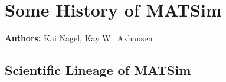 \chapter{Some History of MATSim}
\label{ch:history}

\hfill \textbf{Authors:} Kai Nagel, Kay W.\ Axhausen


%
%


\section{Scientific Lineage of MATSim}
\label{sec:streams}

